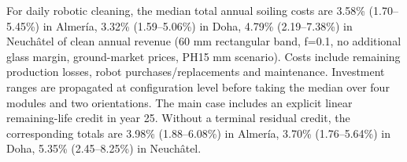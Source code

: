For daily robotic cleaning, the median total annual soiling costs are 3.58\% (1.70--5.45\%) in Almería, 3.32\% (1.59--5.06\%) in Doha, 4.79\% (2.19--7.38\%) in Neuchâtel of clean annual revenue (60 mm rectangular band, f=0.1, no additional glass margin, ground-market prices, PH15 mm scenario). Costs include remaining production losses, robot purchases/replacements and maintenance. Investment ranges are propagated at configuration level before taking the median over four modules and two orientations. The main case includes an explicit linear remaining-life credit in year 25. Without a terminal residual credit, the corresponding totals are 3.98\% (1.88--6.08\%) in Almería, 3.70\% (1.76--5.64\%) in Doha, 5.35\% (2.45--8.25\%) in Neuchâtel.
